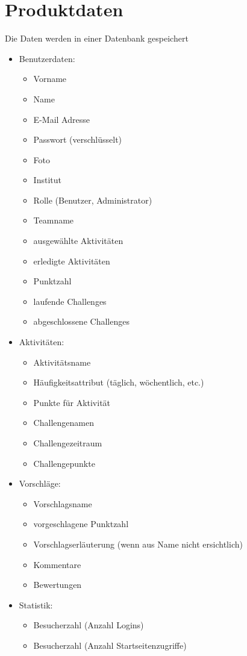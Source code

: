 \section{Produktdaten}
Die Daten werden in einer Datenbank gespeichert \\
\begin{itemize}
\item Benutzerdaten: 
\begin{itemize}
\item Vorname
\item Name
\item E-Mail Adresse
\item Passwort (verschlüsselt)
\item Foto
\item Institut
\item Rolle (Benutzer, Administrator)
\item Teamname
\item ausgewählte Aktivitäten
\item erledigte Aktivitäten
\item Punktzahl
\item laufende Challenges
\item abgeschlossene Challenges
\end{itemize}

\item Aktivitäten: 
\begin{itemize}
\item Aktivitätsname
\item Häufigkeitsattribut (täglich, wöchentlich, etc.)
\item Punkte für Aktivität
\item Challengenamen
\item Challengezeitraum
\item Challengepunkte
\end{itemize}

\item Vorschläge:
\begin{itemize}
\item Vorschlagsname
\item vorgeschlagene Punktzahl
\item Vorschlagserläuterung (wenn aus Name nicht ersichtlich)
\item Kommentare
\item Bewertungen
\end{itemize}

\item Statistik:
\begin{itemize}
\item Besucherzahl (Anzahl Logins)
\item Besucherzahl (Anzahl Startseitenzugriffe)
\end{itemize}
\end{itemize}





